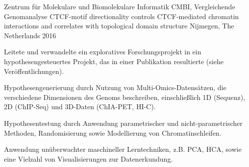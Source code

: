 \begin{cventries}
  \cventry
    { Zentrum für Molekulare und Biomolekulare Informatik CMBI, Vergleichende Genomanalyse } %
    { CTCF-motif directionality controls CTCF-mediated chromatin interactions and correlates with topological domain structure } %
    { Nijmegen, The Netherlands } %
    { 2016 } %
    { 
      \begin{cvitems} %
\item { Leitete und verwandelte ein exploratives Forschungsprojekt in ein hypothesengesteuertes Projekt, das in einer Publikation resultierte (siehe Veröffentlichungen). }
\item { Hypothesengenerierung durch Nutzung von Multi-Omics-Datensätzen, die verschiedene Dimensionen des Genoms beschreiben, einschließlich 1D (Sequenz), 2D (ChIP-Seq) und 3D-Daten (ChIA-PET, HI-C). }
\item { Hypothesentestung durch Anwendung parametrischer und nicht-parametrischer Methoden, Randomisierung sowie Modellierung von Chromatinschleifen. }
\item { Anwendung unüberwachter maschineller Lerntechniken, z.B. PCA, HCA, sowie eine Vielzahl von Visualisierungen zur Datenerkundung. }
      \end{cvitems}
    }

\end{cventries}
\newpage